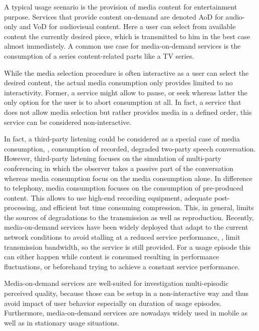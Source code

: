 A typical usage scenario is the provision of media content for entertainment purpose.
Services that provide content on-demand are denoted \ac{AoD} for audio-only and \ac{VoD} for audiovisual content.
Here a user can select from available content the currently desired piece, which is transmitted to him in the best case almost immediately.
A common use case for media-on-demand services is the consumption of a series content-related parts like a TV series.

While the media selection procedure is often interactive as a user can select the desired content, the actual media consumption only provides limited to no interactivity.
Former, a service might allow to pause, or seek whereas latter the only option for the user is to abort consumption at all.
In fact, a service that does not allow media selection but rather provides media in a defined order, this service can be considered non-interactive.

In fact, a third-party listening could be considered as a special case of media consumption, \ie, consumption of recorded, degraded two-party speech conversation.
However, third-party listening focuses on the simulation of multi-party conferencing in which the observer takes a passive part of the conversation whereas media consumption focus on the media consumption alone.
In difference to telephony, media consumption focuses on the consumption of pre-produced content.
This allows to use high-end recording equipment, adequate post-processing, and efficient but time consuming compression.
This, in general, limits the sources of degradations to the transmission as well as reproduction.
Recently, media-on-demand services have been widely deployed that adapt to the current network conditions to avoid stalling at a reduced service performance, \eg, limit transmission bandwidth, so the service is still provided.
For a usage episode this can either happen while content is consumed resulting in performance fluctuations, or beforehand trying to achieve a constant service performance.

Media-on-demand services are well-suited for investigation multi-episodic perceived quality, because those can be setup in a non-interactive way and thus avoid impact of user behavior especially on duration of usage episodes.
Furthermore, media-on-demand services are nowadays widely used in mobile as well as in stationary usage situations. 


